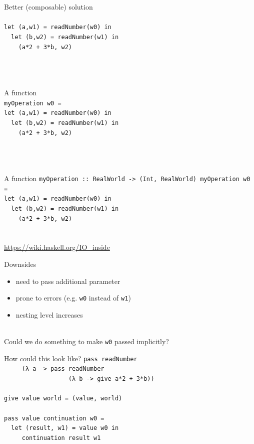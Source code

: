 \documentclass{beamer}
\begin{document}
\begin{frame}{Better (composable) solution}
  \texttt{ \\ \ \\
    let (a,w1) = readNumber(w0) in \\
    \ \ let (b,w2) = readNumber(w1) in \\
    \ \ \ \ (a*2 + 3*b, w2)
  } \\ \ \\ \ \\ \ 
\end{frame}

\begin{frame}{A function}
  \texttt{ \\
    myOperation w0 = \\
    let (a,w1) = readNumber(w0) in \\
    \ \ let (b,w2) = readNumber(w1) in \\
    \ \ \ \ (a*2 + 3*b, w2)
  } \\ \ \\ \ \\ \ 
\end{frame}

\begin{frame}{A function}
  \texttt{myOperation ::\ RealWorld -> (Int, RealWorld)
    myOperation w0 = \\
    let (a,w1) = readNumber(w0) in \\
    \ \ let (b,w2) = readNumber(w1) in \\
    \ \ \ \ (a*2 + 3*b, w2)
  } \\ \ \\ \ \\ \url{https://wiki.haskell.org/IO_inside}
\end{frame}

\begin{frame}{Downsides}
  \pause
  \begin{itemize}
  \item need to pass additional parameter \pause
  \item prone to errors (e.g. \texttt{w0} instead of \texttt{w1}) \pause
  \item nesting level increases \pause
  \end{itemize} \ \\ Could we do something to make \texttt{w0} passed implicitly?
\end{frame}


\begin{frame}{How could this look like?}
  \texttt{pass readNumber \\
    \ \ \ \ \ (λ a \pause -> pass readNumber \\
    \ \ \ \ \ \ \ \ \ \ \ \ \ \ \ \ \ \ (λ b \pause -> give a*2 + 3*b)) \\
    \ \\ \pause
    give value world = (value, world) \\ \pause
    \ \\
    pass value continuation w0 = \\
    \ \ let (result, w1) = value w0 in \\
    \ \ \ \ \ continuation result w1
  }
\end{frame}
\end{document}
